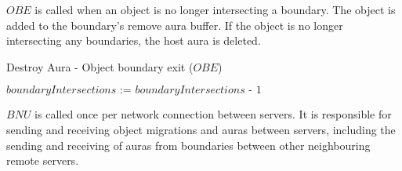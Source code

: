 $OBE$ is called when an object is no longer intersecting a boundary. The object is added to the boundary's remove aura buffer. If the object is no longer intersecting any boundaries, the host aura is deleted.

\begin{algorithm}
	\caption{Destroy Aura - Object boundary exit ($OBE$)}\label{destroyAuraAlgorithm}
	\begin{algorithmic}[1]
		\State {}
		\State
		\State $\textit{boundaryIntersections := boundaryIntersections - 1}$
		\State {}
		\EndIf
		
		\EndProcedure
	\end{algorithmic}
\end{algorithm}

$BNU$ is called once per network connection between servers. It is responsible for sending and receiving object migrations and auras between servers, including the sending and receiving of auras from boundaries between other neighbouring remote servers.

